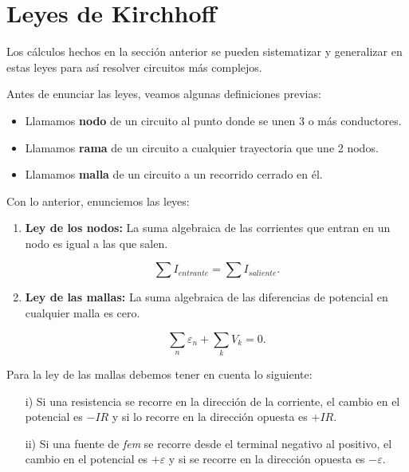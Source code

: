 \section{Leyes de Kirchhoff}

Los cálculos hechos en la sección anterior se pueden sistematizar y generalizar en estas leyes para así resolver circuitos más complejos.

Antes de enunciar las leyes, veamos algunas definiciones previas:

\begin{itemize}
\item Llamamos \textbf{nodo} de un circuito al punto donde se unen 3 o más conductores.

\item Llamamos \textbf{rama} de un circuito a cualquier trayectoria  que une 2 nodos.

\item Llamamos \textbf{malla} de un circuito a un recorrido cerrado en él.
\end{itemize}

Con lo anterior, enunciemos las leyes:

\begin{enumerate}
\item \textbf{Ley de los nodos:} La suma algebraica de las corrientes que entran en un nodo es igual a las que salen.
\begin{shaded}
 $$\sum I_{entrante} = \sum I_{saliente}.$$   
\end{shaded}

\item \textbf{Ley de las mallas:} La suma algebraica de las diferencias de potencial en cualquier malla es cero.
\begin{shaded}
    $$\sum_n \varepsilon_n + \sum_k V_k = 0.$$
\end{shaded}

\end{enumerate}

Para la ley de las mallas debemos tener en cuenta lo siguiente:

\begin{itemize}
\item[i)] Si una resistencia se recorre en la dirección de la corriente, el cambio en el potencial es $-IR$ y si lo recorre en la dirección opuesta es $+IR$.

\item[ii)] Si una fuente de \textit{fem} se recorre desde el terminal negativo al positivo, el cambio en el potencial es $+\varepsilon$ y si se recorre en la dirección opuesta es $- \varepsilon$.
\end{itemize}

